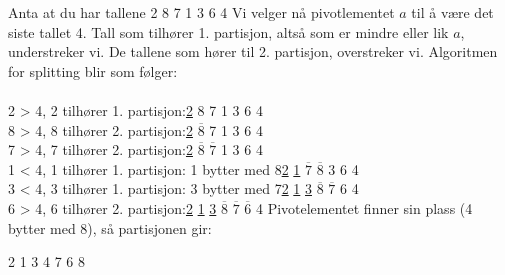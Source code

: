\begin{boxed}
Anta at du har tallene 2 8 7 1 3 6 4
\newline \newline
Vi velger nå pivotlementet $a$ til å være det siste tallet 4. Tall som tilhører 1. partisjon, altså som er mindre eller lik $a$, understreker vi. De tallene som hører til 2. partisjon, overstreker vi. Algoritmen for splitting blir som følger:
\\\\
2 > 4, 2 tilhører 1. partisjon:\hfill \underline{2} 8 7 1 3 6 4\\

8 > 4, 8 tilhører 2. partisjon:\hfill \underline{2} $\overline{8}$ 7 1 3 6 4\\

7 > 4, 7 tilhører 2. partisjon:\hfill \underline{2} $\overline{8}$ $\overline{7}$ 1 3 6 4\\

1 < 4, 1 tilhører 1. partisjon:  1 bytter med 8\hfill \underline{2} \underline{1} $\overline{7}$ $\overline{8}$ 3 6 4\\

3 < 4, 3 tilhører 1. partisjon: 3 bytter med 7\hfill \underline{2} \underline{1} \underline{3} $\overline{8}$ $\overline{7}$ 6 4\\

6 > 4, 6 tilhører 2. partisjon:\hfill \underline{2} \underline{1} \underline{3} $\overline{8}$ $\overline{7}$ $\overline{6}$ 4
\newline\newline
Pivotelementet finner sin plass (4 bytter med 8), så partisjonen gir:
\begin{center}
2 1 3 4 7 6 8
\end{center}
\end{boxed}

